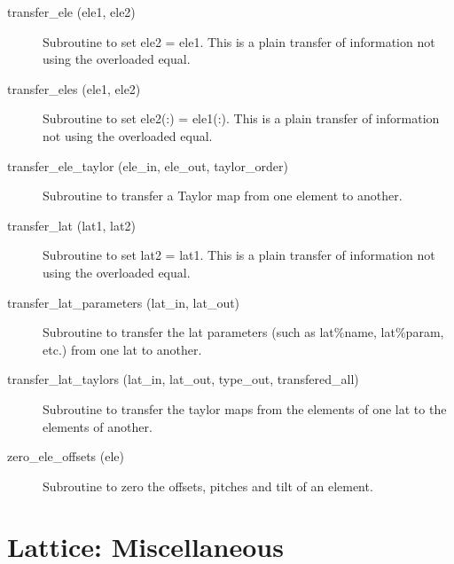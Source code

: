 \begin{description}
\label{r:transfer.ele}
\item[transfer_ele (ele1, ele2)] \Newline 
     Subroutine to set ele2 = ele1. 
     This is a plain transfer of information not using the overloaded equal.

\label{r:transfer.eles}
\item[transfer_eles (ele1, ele2)] \Newline 
     Subroutine to set ele2(:) = ele1(:). 
     This is a plain transfer of information not using the overloaded equal.

\label{r:transfer.ele.taylor}
\item[transfer_ele_taylor (ele_in, ele_out, taylor_order)] \Newline 
     Subroutine to transfer a Taylor map from one element to another.

\label{r:transfer.lat}
\item[transfer_lat (lat1, lat2)] \Newline 
     Subroutine to set lat2 = lat1. 
     This is a plain transfer of information not using the overloaded equal.

\label{r:transfer.lat.parameters}
\item[transfer_lat_parameters (lat_in, lat_out)] \Newline
Subroutine to transfer the lat parameters (such as lat\%name, 
lat\%param, etc.) from one lat to another. 

\label{r:transfer.lat.taylors}
\item[transfer_lat_taylors (lat_in, lat_out, 
                        type_out, transfered_all) ] \Newline 
Subroutine to transfer the taylor maps from the elements of one lat to
the elements of another. 

\label{r:zero.ele.offsets}
\item[zero_ele_offsets (ele)] \Newline 
Subroutine to zero the offsets, pitches and tilt of an element.

\end{description}

\section{Lattice: Miscellaneous}
\label{r:misc.help}

